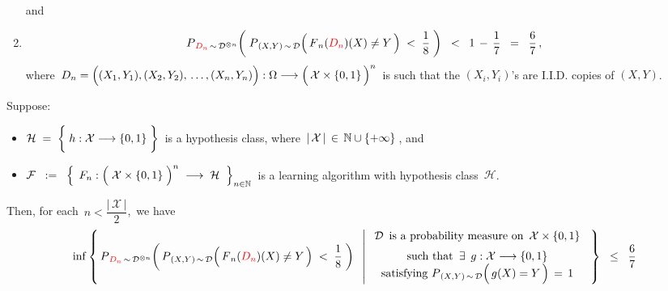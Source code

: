\begin{theorem}
\begin{enumerate}
\begin{equation*}
	\end{equation*}
	and
\item
	\begin{equation*}
	P_{\,{\color{red}D_{n}}\,\sim\,\mathcal{D}^{\otimes n}}\!\left(\;
		P_{\,(X,Y)\,\sim\,\mathcal{D}}\!\left(\,\overset{{\color{white}.}}{F}_{n}({\color{red}D_{n}})(X) \neq Y \,\right)
		\; < \;
			\dfrac{1}{8}
		\;\right)
	\;\; < \;\;
		1 \,-\, \dfrac{1}{7}
	\;\; = \;\;
		\dfrac{6}{7}\,,
	\end{equation*}
	where
	\,$D_{n} = \left((X_{1},Y_{1}),(X_{2},Y_{2}),\,\overset{{\color{white}\vert}}{\ldots}\,,(X_{n},Y_{n})\right)
		: \Omega \longrightarrow
		\left(\,\mathcal{X}\overset{{\color{white}.}}{\times}\{0,1\}\,\right)^{n}$\,
	is such that the
	$(X_{i},Y_{i})$'s are I.I.D. copies of $(X,Y)$.
\end{enumerate}
\end{theorem}


\vskip 1.0cm
\begin{corollary}
\mbox{}\vskip 0.1cm
\noindent
Suppose:
\begin{itemize}
\item
	$\mathcal{H} \; = \; \left\{\; h : \mathcal{X} \overset{{\color{white}\vert}}{\longrightarrow} \{0,1\}\;\right\}$\,
	is a hypothesis class, where \,$\vert\,\mathcal{X}\,\vert \,\in\, \mathbb{N}\cup\{+\infty\}$\,, and
\item
	$\mathcal{F}
	\;\; : = \;\;
		\left\{\;\,
			F_{n} : \left(\;\mathcal{X} \overset{{\color{white}.}}{\times} \{0,1\} \;\right)^{n}
			\; \longrightarrow \;\mathcal{H}
			\;\;\right\}_{n\in\N}$\,
	is a learning algorithm with hypothesis class \,$\mathcal{H}$.
\end{itemize}
Then, for each \,$n < \dfrac{\vert\,\mathcal{X}\,\vert}{2}$,\, we have
\begin{equation*}
\inf\left\{\,
	P_{\,{\color{red}D_{n}}\,\sim\,\mathcal{D}^{\otimes n}}\!\left(\,
		P_{\,(X,Y)\,\sim\,\mathcal{D}}\!\left(\,\overset{{\color{white}.}}{F}_{n}({\color{red}D_{n}})(X) \neq Y \,\right)
		\; < \;
			\dfrac{1}{8}
		\;\right)
	\;\;\left\vert\;
		\begin{array}{c}
		\textnormal{$\mathcal{D}$\, is a probability measure on \,$\mathcal{X} \times \{0,1\}$}
		\\
		\textnormal{such that \,$\overset{{\color{white}-}}{\exists}\;\, g : \mathcal{X} \longrightarrow \{0,1\}$}
		\\
		\textnormal{satisfying $P_{\,(X,Y)\,\sim\,\mathcal{D}}\!\left(\,g(X)\overset{{\color{white}-}}{=}Y\,\right) \,=\, 1$}
		\end{array}
	\right.\;\right\}
\;\; \leq \;\;
	\dfrac{6}{7}
\end{equation*}
\end{corollary}

